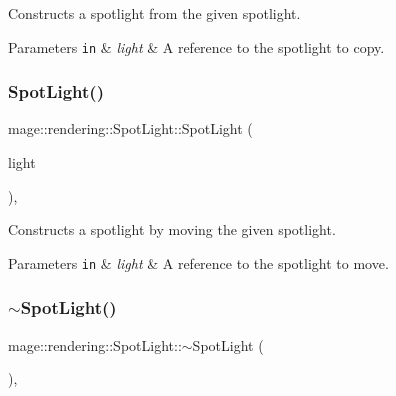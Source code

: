 Constructs a spotlight from the given spotlight.


\begin{DoxyParams}[1]{Parameters}
\mbox{\tt in}  & {\em light} & A reference to the spotlight to copy. \\
\hline
\end{DoxyParams}
\hypertarget{classmage_1_1rendering_1_1_spot_light_a3520d2b04ca636436211e8e4fd929b42}{}\label{classmage_1_1rendering_1_1_spot_light_a3520d2b04ca636436211e8e4fd929b42} 
\subsubsection{\texorpdfstring{Spot\+Light()}{SpotLight()}\hspace{0.1cm}{\footnotesize\ttfamily [3/3]}}
{\footnotesize\ttfamily mage\+::rendering\+::\+Spot\+Light\+::\+Spot\+Light (\begin{DoxyParamCaption}\item[{\hyperlink{classmage_1_1rendering_1_1_spot_light}{Spot\+Light} \&\&}]{light }\end{DoxyParamCaption})\hspace{0.3cm}{\ttfamily [default]}, {\ttfamily [noexcept]}}

Constructs a spotlight by moving the given spotlight.


\begin{DoxyParams}[1]{Parameters}
\mbox{\tt in}  & {\em light} & A reference to the spotlight to move. \\
\hline
\end{DoxyParams}
\hypertarget{classmage_1_1rendering_1_1_spot_light_a3ef5b16d174fd45b40d929b8f06cdea3}{}\label{classmage_1_1rendering_1_1_spot_light_a3ef5b16d174fd45b40d929b8f06cdea3} 
\subsubsection{\texorpdfstring{$\sim$\+Spot\+Light()}{~SpotLight()}}
{\footnotesize\ttfamily mage\+::rendering\+::\+Spot\+Light\+::$\sim$\+Spot\+Light (\begin{DoxyParamCaption}{ }\end{DoxyParamCaption})\hspace{0.3cm}{\ttfamily [virtual]}, {\ttfamily [default]}}

